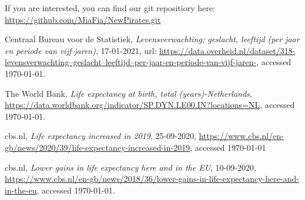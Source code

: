 \documentclass{article}
\begin{document}
If you are interested, you can find our git repositiory here: 
\href{https://github.com/MiaFia/NewPirates.git}{https://github.com/MiaFia/NewPirates.git}



\begin{thebibliography}	{}


 Centraal Bureau voor de Statistiek, \textit{Levensverwachting; geslacht, leeftijd (per jaar en periode van vijf jaren)}, 17-01-2021, url:
\href{https://data.overheid.nl/dataset/318-levensverwachting--geslacht--leeftijd--per-jaar-en-periode-van-vijf-jaren-}{https://data.overheid.nl/dataset/318-levensverwachting--geslacht--leeftijd--per-jaar-en-periode-van-vijf-jaren-}, accessed {\today}. 

 The World Bank, \textit{Life expectancy at birth, total (years)-Netherlands}, \href{https://data.worldbank.org/indicator/SP.DYN.LE00.IN?locations=NL}{https://data.worldbank.org/indicator/SP.DYN.LE00.IN?locations=NL}, accessed {\today}.

cbs.nl, \textit{Life expectancy increased in 2019}, 25-09-2020, \href{https://www.cbs.nl/en-gb/news/2020/39/life-expectancy-increased-in-2019}{https://www.cbs.nl/en-gb/news/2020/39/life-expectancy-increased-in-2019}, accessed {\today}

cbs.nl, \textit{Lower gains in life expectancy here and in the EU}, 10-09-2020, \href{https://www.cbs.nl/en-gb/news/2018/36/lower-gains-in-life-expectancy-here-and-in-the-eu}{https://www.cbs.nl/en-gb/news/2018/36/lower-gains-in-life-expectancy-here-and-in-the-eu}, accessed {\today}.




\end{thebibliography}
\end{document}
